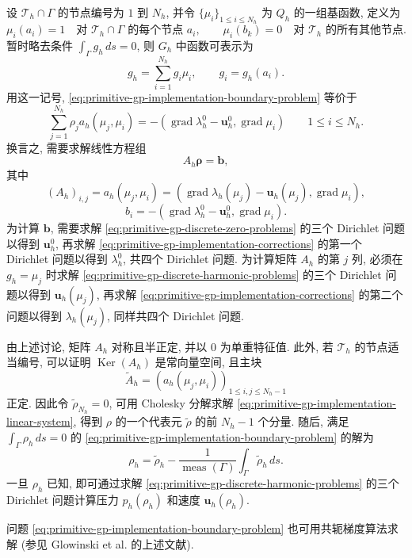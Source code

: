 设 $\mathcal T_h\cap\Gamma$ 的节点编号为 $1$ 到 $N_h$, 并令
$\{\mu_i\}_{1\leq i\leq N_h}$ 为 $Q_h$ 的一组基函数, 定义为
\[
\mu_i(a_i)=1\quad\text{对 }\mathcal T_h\cap\Gamma\text{ 的每个节点 }a_i,
\qquad
\mu_i(b_k)=0\quad\text{对 }\mathcal T_h\text{ 的所有其他节点}.
\]
暂时略去条件 $\int_\Gamma g_h\,ds=0$, 则 $G_h$ 中函数可表示为
\[
g_h=\sum_{i=1}^{N_h}g_i\mu_i,
\qquad g_i=g_h(a_i).
\]
用这一记号, \eqref{eq:primitive-gp-implementation-boundary-problem} 等价于
\[
\sum_{j=1}^{N_h}\rho_j a_h(\mu_j,\mu_i)
=-(\operatorname{grad}\lambda_h^0-\mathbf u_h^0,
\operatorname{grad}\mu_i)
\qquad1\leq i\leq N_h.
\]
换言之, 需要求解线性方程组
\begin{equation}\label{eq:primitive-gp-implementation-linear-system}
A_h\boldsymbol\rho=\mathbf b,
\end{equation}
其中
\[
(A_h)_{i,j}=a_h(\mu_j,\mu_i)
=(\operatorname{grad}\lambda_h(\mu_j)-\mathbf u_h(\mu_j),
\operatorname{grad}\mu_i),
\]
\[
b_i=-(\operatorname{grad}\lambda_h^0-\mathbf u_h^0,
\operatorname{grad}\mu_i).
\]
为计算 $\mathbf b$, 需要求解
\eqref{eq:primitive-gp-discrete-zero-problems} 的三个 Dirichlet 问题以得到
$\mathbf u_h^0$, 再求解
\eqref{eq:primitive-gp-implementation-corrections} 的第一个 Dirichlet 问题以得到
$\lambda_h^0$, 共四个 Dirichlet 问题. 为计算矩阵 $A_h$ 的第 $j$ 列,
必须在 $g_h=\mu_j$ 时求解
\eqref{eq:primitive-gp-discrete-harmonic-problems} 的三个 Dirichlet 问题以得到
$\mathbf u_h(\mu_j)$, 再求解
\eqref{eq:primitive-gp-implementation-corrections} 的第二个问题以得到
$\lambda_h(\mu_j)$, 同样共四个 Dirichlet 问题.

由上述讨论, 矩阵 $A_h$ 对称且半正定, 并以 $0$ 为单重特征值. 此外,
若 $\mathcal T_h$ 的节点适当编号, 可以证明
$\operatorname{Ker}(A_h)$ 是常向量空间, 且主块
\[
\widetilde A_h=(a_h(\mu_j,\mu_i))_{1\leq i,j\leq N_h-1}
\]
正定. 因此令 $\widetilde\rho_{N_h}=0$, 可用 Cholesky 分解求解
\eqref{eq:primitive-gp-implementation-linear-system}, 得到 $\rho$ 的一个代表元
$\widetilde\rho$ 的前 $N_h-1$ 个分量. 随后, 满足
$\int_\Gamma\rho_h\,ds=0$ 的
\eqref{eq:primitive-gp-implementation-boundary-problem} 的解为
\[
\rho_h=\widetilde\rho_h-\frac1{\operatorname{meas}(\Gamma)}
\int_\Gamma\widetilde\rho_h\,ds.
\]
一旦 $\rho_h$ 已知, 即可通过求解
\eqref{eq:primitive-gp-discrete-harmonic-problems} 的三个 Dirichlet 问题计算压力
$p_h(\rho_h)$ 和速度 $\mathbf u_h(\rho_h)$.

问题 \eqref{eq:primitive-gp-implementation-boundary-problem} 也可用共轭梯度算法求解
(参见 Glowinski et al. 的上述文献).
